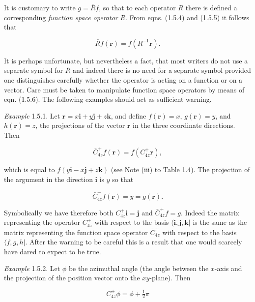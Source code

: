 \documentclass[11pt,a4paper,twoside,openright]{book}
\begin{document}
It is customary to write $g = \bar{R}f$, so that to each operator $R$ there is defined a corresponding \textit{function space operator} $\bar{R}$. From eqns. (1.5.4) and (1.5.5) it follows that

\begin{equation*}
\bar{R}f(\mathbf{r}) = f(R^{-1}\mathbf{r}). \tag{1.5.6}
\end{equation*}

It is perhaps unfortunate, but nevertheless a fact, that most writers do not use a separate symbol for $\bar{R}$ and indeed there is no need for a separate symbol provided one distinguishes carefully whether the operator is acting on a function or on a vector. Care must be taken to manipulate function space operators by means of eqn. (1.5.6). The following examples should act as sufficient warning.

\textit{Example} 1.5.1. Let $\mathbf{r} = x\mathbf{i} + y\mathbf{j} + z\mathbf{k}$, and define $f(\mathbf{r}) = x$, $g(\mathbf{r}) = y$, and $h(\mathbf{r}) = z$, the projections of the vector $\mathbf{r}$ in the three coordinate directions. Then

\begin{equation*}
\bar{C}_{4z}^{+}f(\mathbf{r}) = f(C_{4z}^{+}\mathbf{r}), \tag{1.5.7}
\end{equation*}

which is equal to $f(y\mathbf{i} - x\mathbf{j} + z\mathbf{k})$ (see Note (iii) to Table 1.4). The projection of the argument in the direction $\mathbf{i}$ is $y$ so that

\begin{equation*}
\bar{C}_{4z}^{+}f(\mathbf{r}) = y = g(\mathbf{r}). \tag{1.5.8}
\end{equation*}

Symbolically we have therefore both $C_{4z}^{+}\mathbf{i} = \mathbf{j}$ and $\bar{C}_{4z}^{+}f = g$. Indeed the matrix representing the operator $C_{4z}^{+}$ with respect to the basis $\langle \mathbf{i}, \mathbf{j}, \mathbf{k}|$ is the same as the matrix representing the function space operator $\bar{C}_{4z}^{+}$ with respect to the basis $\langle f, g, h|$. After the warning to be careful this is a result that one would scarcely have dared to expect to be true.

\textit{Example} 1.5.2. Let $\phi$ be the azimuthal angle (the angle between the $x$-axis and the projection of the position vector onto the $xy$-plane). Then

\begin{equation*}
C_{4z}^{+}\phi = \phi + \tfrac{1}{2}\pi \tag{1.5.9}
\end{equation*}
\end{document}
